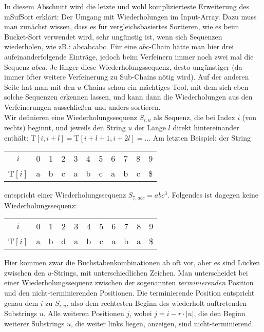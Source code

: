 In diesem Abschnitt wird die letzte und wohl komplizierteste Erweiterung des mSufSort erklärt: Der Umgang mit Wiederholungen im Input-Array. Dazu muss man zunächst wissen, dass es für vergleichsbasiertes Sortieren, wie es beim Bucket-Sort verwendet wird, sehr ungünstig ist, wenn sich Sequenzen wiederholen, wie zB.: \glqq abcabcabc\grqq{}. Für eine $abc$-Chain hätte man hier drei aufeinanderfolgende Einträge, jedoch beim Verfeinern immer noch zwei mal die Sequenz $abca$. Je länger diese Wiederholungssequenz, desto ungünstiger (da immer öfter weitere Verfeinerung zu Sub-Chains nötig wird).
Auf der anderen Seite hat man mit den $u$-Chains schon ein mächtiges Tool, mit dem sich eben solche Sequenzen erkennen lassen, und kann dann die Wiederholungen aus den Verfeinerungen ausschließen und anders sortieren.\\
Wir definieren eine Wiederholungssequenz $S_{i,u}$ als Sequenz, die bei Index $i$ (von rechts) beginnt, und jeweils den String $u$ der Länge $l$ direkt hintereinander enthält:
T$[i, i+l]=$T$[i+l+1, i+2l]=...$
Am letzten Beispiel: der String 
\begin{center}
\begin{tabular}{c c c c c c c c c c c}
$i$ & 0 & 1 & 2 & 3 & 4 & 5 & 6 & 7 & 8 & 9\\
T$[i]$ & a & b & c & a & b & c & a & b & c & \$\\
\end{tabular}
\end{center}
entspricht einer Wiederholungssequenz $S_{7,abc} = abc^3$.
Folgendes ist dagegen keine Wiederholungssequenz:
\begin{center}
\begin{tabular}{c c c c c c c c c c c}
$i$ & 0 & 1 & 2 & 3 & 4 & 5 & 6 & 7 & 8 & 9\\
T$[i]$ & a & b & d & a & b & c & a & b & a & \$\\
\end{tabular}
\end{center}
Hier kommen zwar die Buchstabenkombinationen \glqq ab\grqq{} oft vor, aber es sind Lücken zwischen den $u$-Strings, mit unterschiedlichen Zeichen.
Man unterscheidet bei einer Wiederholungssequenz zwischen der sogenannten \textit{terminierenden} Position und den {nicht-terminierenden} Positionen. Die terminierende Position entspricht genau dem $i$ zu $S_{i,u}$, also dem rechtesten Beginn des wiederholt auftretenden Substrings $u$. Alle weiteren Positionen $j$, wobei $j = i-r\cdot |u|$, die den Beginn weiterer Substrings $u$, die weiter links liegen, anzeigen, sind nicht-terminierend.\\
